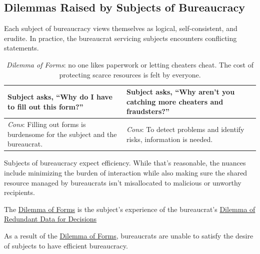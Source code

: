 \subsection*{Dilemmas Raised by Subjects of Bureaucracy\label{sec:subjects-dilemmas}}


Each subject of bureaucracy views themselves as logical, self-consistent, and erudite. In practice, the bureaucrat servicing subjects encounters conflicting statements. 

\begin{center}
\begin{table}[H] %
\begin{tabular}{ | m{\dilemmatablewidth}| m{\dilemmatablewidth} | } 
  \hline
  \textbf{Subject asks, ``Why do I have to fill out this form?''} &
  \textbf{Subject asks, ``Why aren't you catching more cheaters and fraudsters?''} \\
  \hline
  \textit{Cons}: Filling out forms is burdensome for the subject and the bureaucrat. & 
  \textit{Cons}: To detect problems and identify risks, information is needed. \\
  \hline
\end{tabular}
\caption{\textit{Dilemma of Forms}: no one likes paperwork or letting cheaters cheat. The cost of protecting scarce resources is felt by everyone.
}
\label{table:dilemma-subject-forms}
\end{table}
\end{center}

Subjects of bureaucracy expect efficiency. While that's reasonable, the nuances include minimizing the burden of interaction while also making sure the shared resource managed by bureaucrats isn't misallocated to malicious or unworthy recipients. 

The 
\hyperref[table:dilemma-subject-forms]{Dilemma of Forms}
is the subject's experience of the bureaucrat's 
\hyperref[table:dilemma-personal-single-bit-decision]{Dilemma of Redundant Data for Decisions}

%
As a result of the \hyperref[table:dilemma-subject-forms]{Dilemma of Forms}, bureaucrats are unable to satisfy the desire of subjects to have efficient bureaucracy. 

